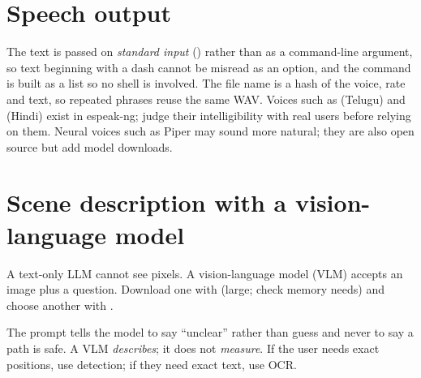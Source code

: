 \section{Speech output}

The text is passed on \emph{standard input} () rather than as a command-line argument, so text beginning with a dash cannot be misread as an option, and the command is built as a list so no shell is involved. The file name is a hash of the voice, rate and text, so repeated phrases reuse the same WAV. Voices such as  (Telugu) and  (Hindi) exist in espeak-ng; judge their intelligibility with real users before relying on them. Neural voices such as Piper may sound more natural; they are also open source but add model downloads.

\section{Scene description with a vision-language model}
A text-only LLM cannot see pixels. A vision-language model (VLM) accepts an image plus a question. Download one with  (large; check memory needs) and choose another with .

The prompt tells the model to say ``unclear'' rather than guess and never to say a path is safe. A VLM \emph{describes}; it does not \emph{measure}. If the user needs exact positions, use detection; if they need exact text, use OCR.

